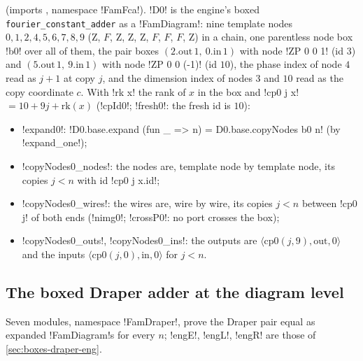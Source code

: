 { (imports , namespace \lbx!FamFca!). \lbx!D0! is the engine's boxed \texttt{fourier\_constant\_adder} as a \lbx!FamDiagram!: nine template nodes $0,1,2,4,5,6,7,8,9$ (Z, $F$, Z, Z, Z, $F$, $F$, $F$, Z) in a chain, one parentless node box \lbx!b0! over all of them, the pair boxes $(2.\mathrm{out}\,1,\ 0.\mathrm{in}\,1)$ with node \lbx!ZP 0 0 1! (id $3$) and $(5.\mathrm{out}\,1,\ 9.\mathrm{in}\,1)$ with node \lbx!ZP 0 0 (-1)! (id $10$), the phase index of node $4$ read as $j+1$ at copy $j$, and the dimension index of nodes $3$ and $10$ read as the copy coordinate $c$. With \lbx!rk x! the rank of $x$ in the box and \lbx!cp0 j x! $=10+9j+\mathrm{rk}(x)$ (\lbx!cpId0!; \lbx!fresh0!: the fresh id is $10$):
\begin{itemize}
\item \lbx!expand0!: \lbx!D0.base.expand (fun _ => n) = D0.base.copyNodes b0 n! (by \lbx!expand_one!);
\item \lbx!copyNodes0_nodes!: the nodes are, template node by template node, its copies $j<n$ with id \lbx!cp0 j x.id!;
\item \lbx!copyNodes0_wires!: the wires are, wire by wire, its copies $j<n$ between \lbx!cp0 j! of both ends (\lbx!nimg0!; \lbx!crossP0!: no port crosses the box);
\item \lbx!copyNodes0_outs!, \lbx!copyNodes0_ins!: the outputs are $\langle\mathrm{cp0}(j,9),\mathrm{out},0\rangle$ and the inputs $\langle\mathrm{cp0}(j,0),\mathrm{in},0\rangle$ for $j<n$.
\end{itemize}

\subsection{The boxed Draper adder at the diagram level}\label{sec:boxes-famdraper}

Seven modules, namespace \lbx!FamDraper!, prove the Draper pair equal as expanded \lbx!FamDiagram!s for every $n$; \lbx!engE!, \lbx!engL!, \lbx!engR! are those of \cref{sec:boxes-draper-eng}.

}
